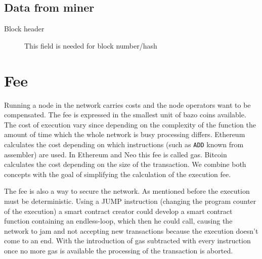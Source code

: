 \subsection{Data from miner}
\begin{description}
  \item[Block header] This field is needed for block number/hash
\end{description}

\section{Fee} \label{fee}
Running a node in the network carries costs and the node operators want to be compensated. The fee is expressed in the smallest unit of bazo coins available. The cost of execution vary since depending on the complexity of the function the amount of time which the whole network is busy processing differs. Ethereum calculates the cost depending on which instructions (such as \texttt{ADD} known from assembler) are used. In Ethereum and Neo this fee is called gas. Bitcoin calculates the cost depending on the size of the transaction. We combine both concepts with the goal of simplifying the calculation of the execution fee.

The fee is also a way to secure the network. As mentioned before the execution must be deterministic. Using a JUMP instruction (changing the program counter of the execution) a smart contract creator could develop a smart contract function containing an endless-loop, which then he could call, causing the network to jam and not accepting new transactions because the execution doesn't come to an end. With the introduction of gas subtracted with every instruction once no more gas is available the processing of the transaction is aborted.